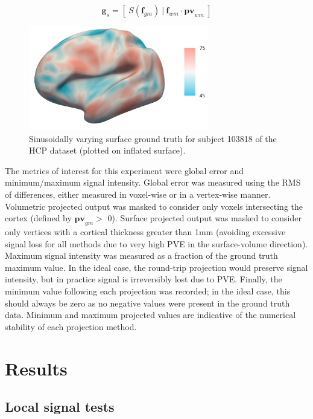 \documentclass[12pt]{report}
\renewcommand{\vec}[1]{\mathbf{#1}}
\begin{document}
\begin{equation}
\vec{g}_s =  [\ S(\vec{f}_{gm}) \ | \ \vec{f}_{wm} \cdot \vec{pv}_{wm} \  ]
\end{equation}

\begin{figure}
\centering
\includegraphics[width=0.7\textwidth]{struth}
\caption{Sinusoidally varying surface ground truth for subject 103818 of the HCP dataset (plotted on inflated surface).}
\label{surf_truth} 
\end{figure}

The metrics of interest for this experiment were global error and minimum/maximum signal intensity. Global error was measured using the RMS of differences, either measured in voxel-wise or in a vertex-wise manner. Volumetric projected output was masked to consider only voxels intersecting the cortex (defined by $\vec{pv}_{gm} >$ 0). Surface projected output was masked to consider only vertices with a cortical thickness greater than 1mm (avoiding excessive signal loss for all methods due to very high PVE in the surface-volume direction). Maximum signal intensity was measured as a fraction of the ground truth maximum value. In the ideal case, the round-trip projection would preserve signal intensity, but in practice signal is irreversibly lost due to PVE. Finally, the minimum value following each projection was recorded; in the ideal case, this should always be zero as no negative values were present in the ground truth data. Minimum and maximum projected values are indicative of the numerical stability of each projection method. 

\section{Results}

\subsection{Local signal tests}
\end{document}
